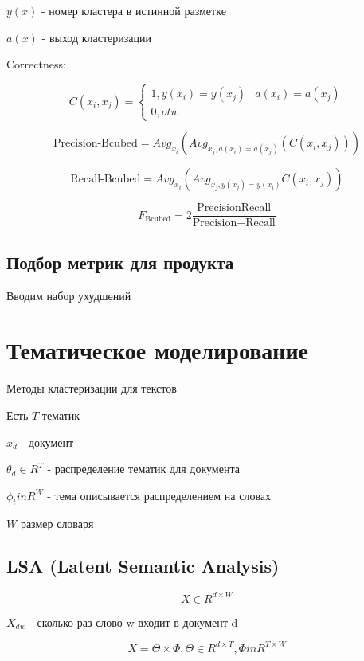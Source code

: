 \documentclass[a4paper, 12pt]{article}
\begin{document}
\begin{enumerate}
\begin{enumerate}
\begin{enumerate}
            $y(x)$ - номер кластера в истинной разметке
            
            $a(x)$ - выход кластеризации

            Correctness:

            \[C(x_i, x_j) = 
            \begin{cases}
                1, y(x_i) = y(x_j) & a(x_i) = a(x_j) \\
                0, otw
            \end{cases}\]

            \[\textrm{Precision-Bcubed} = Avg_{x_i}(Avg_{x_j, a(x_i) = a(x_j)}(C(x_i, x_j)))\]

            \[\textrm{Recall-Bcubed} = Avg_{x_i}(Avg_{x_j, y(x_j) = y(x_i)} C(x_i, x_j))\]

            \[F_{\textrm{Bcubed}} = 2 \frac{\textrm{Precision}\textrm{Recall}}{\textrm{Precision} + \textrm{Recall}}\]
        \end{enumerate}
    \end{enumerate}
\end{enumerate}

\subsection{Подбор метрик для продукта}

Вводим набор ухудшений 

\section{Тематическое моделирование}

Методы кластеризации для текстов

Есть $T$ тематик

$x_d$ - документ

$\theta_d \in R^T$ - распределение тематик для документа

$\phi_t in R^W$ - тема описывается распределением на словах

$W$ размер словаря

\subsection{LSA (Latent Semantic Analysis)}

\[X \in R^{d \times W}\]

$X_{dw}$ - сколько раз слово w входит в документ d

\[X = \Theta \times \Phi, \Theta \in R^{d \times T}, \Phi in R^{T \times W}\]
\end{document}
